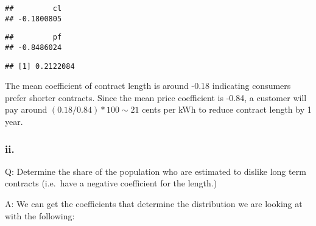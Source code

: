 \documentclass[
]{article}
\newenvironment{Shaded}{\begin{snugshade}}{\end{snugshade}}
\newcommand{\DecValTok}[1]{\textcolor[rgb]{0.00,0.00,0.81}{#1}}
\newcommand{\KeywordTok}[1]{\textcolor[rgb]{0.13,0.29,0.53}{\textbf{#1}}}
\newcommand{\NormalTok}[1]{#1}
\newcommand{\OperatorTok}[1]{\textcolor[rgb]{0.81,0.36,0.00}{\textbf{#1}}}
\newcommand{\StringTok}[1]{\textcolor[rgb]{0.31,0.60,0.02}{#1}}
\begin{document}
\begin{Shaded}
\end{Shaded}

\begin{verbatim}
##         cl 
## -0.1800805
\end{verbatim}

\begin{Shaded}
\end{Shaded}

\begin{verbatim}
##         pf 
## -0.8486024
\end{verbatim}

\begin{Shaded}
\end{Shaded}

\begin{verbatim}
## [1] 0.2122084
\end{verbatim}

The mean coefficient of contract length is around -0.18 indicating
consumers prefer shorter contracts. Since the mean price coefficient is
-0.84, a customer will pay around \((0.18/0.84)*100 \sim 21\) cents per
kWh to reduce contract length by 1 year.

\hypertarget{ii.-4}{%
\subsubsection{ii.}\label{ii.-4}}

Q: Determine the share of the population who are estimated to dislike
long term contracts (i.e.~have a negative coefficient for the length.)

A: We can get the coefficients that determine the distribution we are
looking at with the following:
\end{document}
